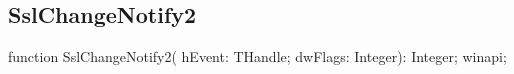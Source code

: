 \documentclass{report}
\newif\ifpdf
\begin{document}
\subsection*{SslChangeNotify2}
\fi
\label{ok_winapi-SslChangeNotify2}
\begin{list}{}{
\setlength{\itemindent}{0cm}
\setlength{\listparindent}{0cm}
\setlength{\leftmargin}{\evensidemargin}
\addtolength{\leftmargin}{\tmplength}
\settowidth{\labelsep}{X}
\addtolength{\leftmargin}{\labelsep}
\setlength{\labelwidth}{\tmplength}
}
\item[\textbf{Declaration}\hfill]
\ifpdf
\begin{flushleft}
\fi
\begin{ttfamily}
function SslChangeNotify2( hEvent: THandle; dwFlags: Integer): Integer; winapi;\end{ttfamily}

\ifpdf
\end{flushleft}
\fi

\end{list}
\end{document}
